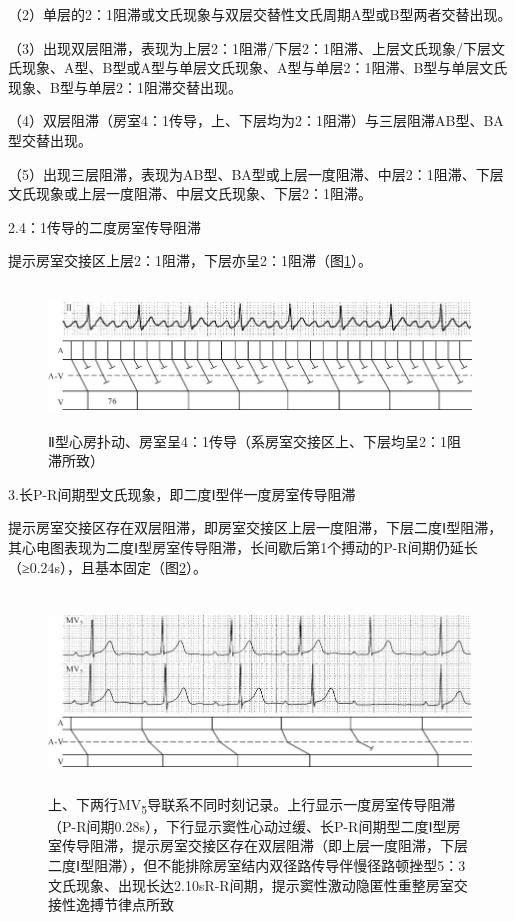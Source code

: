 （2）单层的2：1阻滞或文氏现象与双层交替性文氏周期A型或B型两者交替出现。

（3）出现双层阻滞，表现为上层2：1阻滞/下层2：1阻滞、上层文氏现象/下层文氏现象、A型、B型或A型与单层文氏现象、A型与单层2：1阻滞、B型与单层文氏现象、B型与单层2：1阻滞交替出现。

（4）双层阻滞（房室4：1传导，上、下层均为2：1阻滞）与三层阻滞AB型、BA型交替出现。

（5）出现三层阻滞，表现为AB型、BA型或上层一度阻滞、中层2：1阻滞、下层文氏现象或上层一度阻滞、中层文氏现象、下层2：1阻滞。

2.4：1传导的二度房室传导阻滞

提示房室交接区上层2：1阻滞，下层亦呈2：1阻滞（图\ref{fig24-3}）。

\begin{figure}[!htbp]
 \centering
 \includegraphics[width=5.79167in,height=1.47917in]{./images/Image00398.jpg}
 \captionsetup{justification=centering}
 \caption{Ⅱ型心房扑动、房室呈4：1传导（系房室交接区上、下层均呈2：1阻滞所致）}
 \label{fig24-3}
  \end{figure} 

3.长P-R间期型文氏现象，即二度Ⅰ型伴一度房室传导阻滞

提示房室交接区存在双层阻滞，即房室交接区上层一度阻滞，下层二度Ⅰ型阻滞，其心电图表现为二度Ⅰ型房室传导阻滞，长间歇后第1个搏动的P-R间期仍延长（≥0.24s），且基本固定（图\ref{fig24-4}）。

\begin{figure}[!htbp]
 \centering
 \includegraphics[width=5.80208in,height=2.07292in]{./images/Image00399.jpg}
 \captionsetup{justification=centering}
 \caption{上、下两行MV\textsubscript{5}导联系不同时刻记录。上行显示一度房室传导阻滞（P-R间期0.28s），下行显示窦性心动过缓、长P-R间期型二度Ⅰ型房室传导阻滞，提示房室交接区存在双层阻滞（即上层一度阻滞，下层二度Ⅰ型阻滞），但不能排除房室结内双径路传导伴慢径路顿挫型5：3文氏现象、出现长达2.10sR-R间期，提示窦性激动隐匿性重整房室交接性逸搏节律点所致}
 \label{fig24-4}
  \end{figure} 


